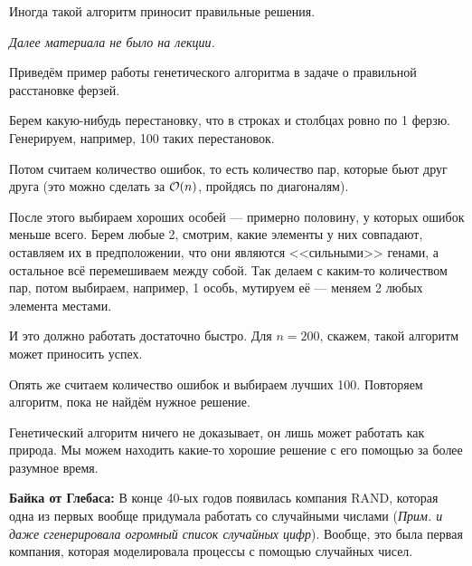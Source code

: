 \documentclass[a4paper, 12pt]{article}
\begin{document}
Иногда такой алгоритм приносит правильные решения. 

{\it Далее материала не было на лекции.}

Приведём пример работы генетического алгоритма в задаче о правильной
расстановке ферзей.

Берем какую-нибудь перестановку, что в строках и столбцах ровно по 1 ферзю.
Генерируем, например, 100 таких перестановок.

Потом считаем количество ошибок, то есть количество пар, которые бьют друг
друга (это можно сделать за $\mathcal{O}(n)$, пройдясь по диагоналям).

После этого выбираем хороших особей --- примерно половину, у которых ошибок
меньше всего. Берем любые 2, смотрим, какие элементы у них совпадают, оставляем
их в предположении, что они являются <<сильными>> генами, а остальное всё
перемешиваем между собой. Так делаем с каким-то количеством пар, потом
выбираем, например, 1 особь, мутируем её --- меняем 2 любых элемента местами.

И это должно работать достаточно быстро. Для $n = 200$, скажем, такой
алгоритм может приносить успех.

Опять же считаем количество ошибок и выбираем лучших 100. Повторяем алгоритм,
пока не найдём нужное решение.

Генетический алгоритм ничего не доказывает, он лишь может работать как природа.
Мы можем находить какие-то хорошие решение с его помощью за более разумное время.

{\bf Байка от Глебаса:}
  В конце 40-ых годов появилась компания RAND, которая одна из первых вообще
  придумала работать со случайными числами ({\it Прим. и даже сгенерировала 
  огромный список случайных цифр}). Вообще, это была первая компания, которая
  моделировала процессы с помощью случайных чисел.
\end{document}
